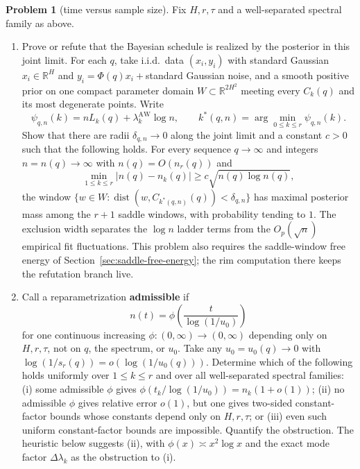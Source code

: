 \documentclass[11pt]{amsart}
\theoremstyle{plain}
\theoremstyle{definition}
\newtheorem{problem}[theorem]{Problem}
\newcommand{\R}{\mathbb{R}}
\newcommand{\dist}{\operatorname{dist}}
\begin{document}
\begin{problem}[time versus sample size]\label{prob:dictionary}
Fix $H,r,\tau$ and a well-separated spectral family as above.
\begin{enumerate}
\item[(a)] Prove or refute that the Bayesian schedule is realized by the posterior in this joint limit. For each $q$, take i.i.d.\ data $(x_i,y_i)$ with standard Gaussian $x_i\in\R^H$ and $y_i=\Phi(q)x_i+{}$standard Gaussian noise, and a smooth positive prior on one compact parameter domain $W\subset\R^{2H^2}$ meeting every $C_k(q)$ and its most degenerate points. Write
\[
   \psi_{q,n}(k)=nL_k(q)+\lambda_k^{\mathrm{AW}}\log n,
   \qquad
   k^*(q,n)=\arg\min_{0\le k\le r}\psi_{q,n}(k).
\]
Show that there are radii $\delta_{q,n}\to0$ along the joint limit and a constant $c>0$ such that the following holds. For every sequence $q\to\infty$ and integers $n=n(q)\to\infty$ with $n(q)=O(n_r(q))$ and
\[
   \min_{1\le k\le r}|n(q)-n_k(q)|
   \ge c\sqrt{n(q)\log n(q)},
\]
the window $\{w\in W:\dist(w,C_{k^*(q,n)}(q))<\delta_{q,n}\}$ has maximal posterior mass among the $r+1$ saddle windows, with probability tending to $1$. The exclusion width separates the $\log n$ ladder terms from the $O_p(\sqrt n)$ empirical fit fluctuations. This problem also requires the saddle-window free energy of Section~\ref{sec:saddle-free-energy}; the rim computation there keeps the refutation branch live.
\item[(b)] Call a reparametrization \textbf{admissible} if
\[
   n(t)=\phi\!\left(\frac{t}{\log(1/u_0)}\right)
\]
for one continuous increasing $\phi\colon(0,\infty)\to(0,\infty)$ depending only on $H,r,\tau$, not on $q$, the spectrum, or $u_0$. Take any $u_0=u_0(q)\to0$ with $\log(1/s_r(q))=o(\log(1/u_0(q)))$. Determine which of the following holds uniformly over $1\le k\le r$ and over all well-separated spectral families: (i) some admissible $\phi$ gives $\phi(t_k/\log(1/u_0))=n_k(1+o(1))$; (ii) no admissible $\phi$ gives relative error $o(1)$, but one gives two-sided constant-factor bounds whose constants depend only on $H,r,\tau$; or (iii) even such uniform constant-factor bounds are impossible. Quantify the obstruction. The heuristic below suggests (ii), with $\phi(x)\asymp x^2\log x$ and the exact mode factor $\Delta\lambda_k$ as the obstruction to (i).
\end{enumerate}
\end{problem}
\end{document}
